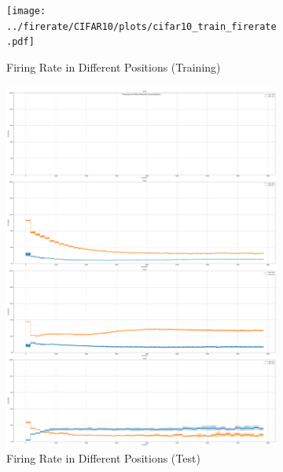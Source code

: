         \begin{figure}[H]
            \centering
            \begin{subfigure}[H]{0.48\textwidth}
                \centering
                \texttt{[image: ../firerate/CIFAR10/plots/cifar10\_train\_firerate.pdf]}
                \caption{Firing Rate in Different Positions (Training)}
            \end{subfigure}
            \hfill
            \begin{subfigure}[H]{0.48\textwidth}
                \centering
                \includegraphics[width=\textwidth]{../firerate/CIFAR10/plots/cifar10_test_firerate.pdf}
                \caption{Firing Rate in Different Positions (Test)}
            \end{subfigure}
            \hfill
            \begin{subfigure}[H]{\textwidth}
                \centering

\end{subfigure}
\end{figure}
